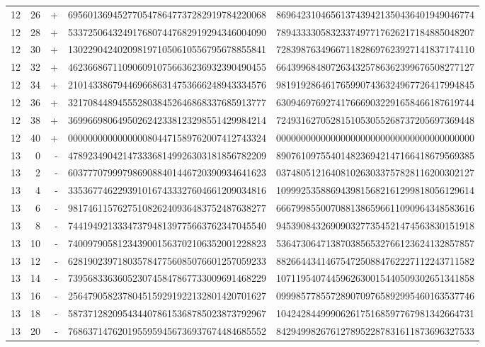 \begin{longtable}{rrrll}
12 & 26 & + & 6956013694527705478647737282919784220068 & 8696423104656137439421350436401949046774 \\
12 & 28 & + & 5337250643249176807447682919294346004090 & 7894333305832337497717626217184885048207 \\
12 & 30 & + & 1302290424020981971050610556795678855841 & 7283987634966711828697623927141837174110 \\
12 & 32 & + & 4623668671109060910756636236932390490455 & 6643996848072634325786362399676508277127 \\
12 & 34 & + & 2101433867944696686314753666248943334576 & 9819192864617659907436324967726417994845 \\
12 & 36 & + & 3217084489455528038452646868337685913777 & 6309469769274176669032291658466187619744 \\
12 & 38 & + & 3699669806495026242338123298551429984214 & 7249316270528151053055268737205697369448 \\
12 & 40 & + & 0000000000000000804471589762007412743324 & 0000000000000000000000000000000000000000 \\
13 & 0 & - & 4789234904214733368149926303181856782209 & 8907610975540148236942147166418679569385 \\
13 & 2 & - & 6037770799979869088401446720390934641623 & 0374805121640810263033757828116200302127 \\
13 & 4 & - & 3353677462293910167433327604661209034816 & 1099925358869439815682161299818056129614 \\
13 & 6 & - & 9817461157627510826240936483752487638277 & 6667998550070881386596611090964348583616 \\
13 & 8 & - & 7441949213334737948139775663762347045540 & 9453908432690903277354521474563830151918 \\
13 & 10 & - & 7400979058123439001563702106352001228823 & 5364730647138703856532766123624132857857 \\
13 & 12 & - & 6281902397180357847756085076601257059233 & 8826644341467547250884762227112243711582 \\
13 & 14 & - & 7395683363605230745847867733009691468229 & 1071195407445962630015440509302651341858 \\
13 & 16 & - & 2564790582378045159291922132801420701627 & 0999857785572890709765892995460163537746 \\
13 & 18 & - & 5873712820954344078615368785023873792967 & 1042428449990626175168597767981342664731 \\
13 & 20 & - & 7686371476201955959456736937674484685552 & 8429499826761278952287831611873696327533 \\

\end{longtable}

